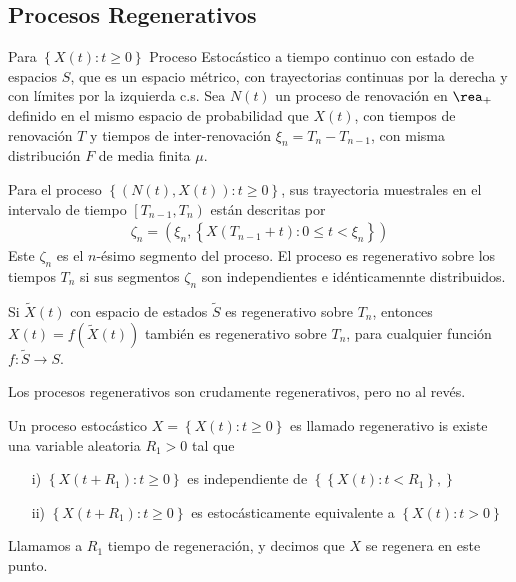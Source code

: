 \subsection{Procesos Regenerativos}

Para $\left\{X\left(t\right):t\geq0\right\}$ Proceso Estoc\'astico a tiempo continuo con estado de espacios $S$, que es un espacio m\'etrico, con trayectorias continuas por la derecha y con l\'imites por la izquierda c.s. Sea $N\left(t\right)$ un proceso de renovaci\'on en $\rea_{+}$ definido en el mismo espacio de probabilidad que $X\left(t\right)$, con tiempos de renovaci\'on $T$ y tiempos de inter-renovaci\'on $\xi_{n}=T_{n}-T_{n-1}$, con misma distribuci\'on $F$ de media finita $\mu$.



\begin{Def}
Para el proceso $\left\{\left(N\left(t\right),X\left(t\right)\right):t\geq0\right\}$, sus trayectoria muestrales en el intervalo de tiempo $\left[T_{n-1},T_{n}\right)$ est\'an descritas por
\begin{eqnarray*}
\zeta_{n}=\left(\xi_{n},\left\{X\left(T_{n-1}+t\right):0\leq t<\xi_{n}\right\}\right)
\end{eqnarray*}
Este $\zeta_{n}$ es el $n$-\'esimo segmento del proceso. El proceso es regenerativo sobre los tiempos $T_{n}$ si sus segmentos $\zeta_{n}$ son independientes e id\'enticamennte distribuidos.
\end{Def}


\begin{Obs}
Si $\tilde{X}\left(t\right)$ con espacio de estados $\tilde{S}$ es regenerativo sobre $T_{n}$, entonces $X\left(t\right)=f\left(\tilde{X}\left(t\right)\right)$ tambi\'en es regenerativo sobre $T_{n}$, para cualquier funci\'on $f:\tilde{S}\rightarrow S$.
\end{Obs}

\begin{Obs}
Los procesos regenerativos son crudamente regenerativos, pero no al rev\'es.
\end{Obs}

\begin{Def}
Un proceso estoc\'astico $X=\left\{X\left(t\right):t\geq0\right\}$ es llamado regenerativo is existe una variable aleatoria $R_{1}>0$ tal que
\begin{itemize}
\item[i)] $\left\{X\left(t+R_{1}\right):t\geq0\right\}$ es independiente de $\left\{\left\{X\left(t\right):t<R_{1}\right\},\right\}$
\item[ii)] $\left\{X\left(t+R_{1}\right):t\geq0\right\}$ es estoc\'asticamente equivalente a $\left\{X\left(t\right):t>0\right\}$
\end{itemize}

Llamamos a $R_{1}$ tiempo de regeneraci\'on, y decimos que $X$ se regenera en este punto.
\end{Def}

